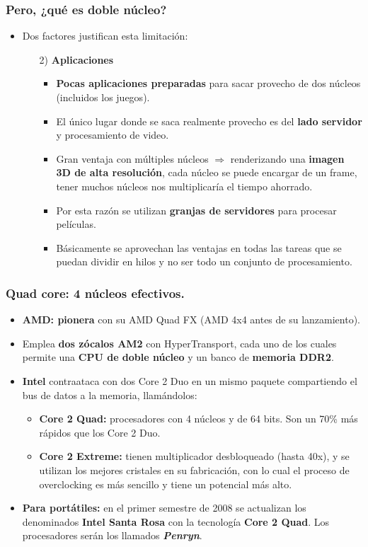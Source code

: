 \frame
{
\frametitle{Pero, ¿qué es doble núcleo?}
\begin{itemize}
 	\item Dos factores justifican esta limitación:

	\begin{itemize}
	\item[2)] \textbf{Aplicaciones}

		\begin{itemize}
		\item \textbf{Pocas aplicaciones preparadas} para sacar provecho de dos núcleos (incluidos los juegos).
		\item El único lugar donde se saca realmente provecho es del \textbf{lado servidor} y procesamiento de video.
		\item Gran ventaja con múltiples núcleos $\Rightarrow$ renderizando una \textbf{imagen 3D de alta resolución}, cada núcleo se puede encargar de un frame, tener muchos núcleos nos multiplicaría el tiempo ahorrado.
		\item Por esta razón se utilizan \textbf{granjas de servidores} para procesar películas.
		\item Básicamente se aprovechan las ventajas en todas las tareas que se puedan dividir en hilos y no ser todo un conjunto de procesamiento.
		\end{itemize}

	\end{itemize}

\end{itemize}
}

\frame
{
\frametitle{Quad core: 4 núcleos efectivos.}
\begin{itemize}
\item \textbf{AMD: pionera} con su AMD Quad FX (AMD 4x4 antes de su lanzamiento).
\item Emplea \textbf{dos zócalos AM2} con HyperTransport, cada uno de los cuales permite una \textbf{CPU de doble núcleo} y un banco de \textbf{memoria DDR2}.
\item \textbf{Intel} contraataca con dos Core 2 Duo en un mismo paquete compartiendo el bus de datos a la memoria, llamándolos:
	\begin{itemize}
	\item \textbf{Core 2 Quad:} procesadores con 4 núcleos y de 64 bits. Son un 70\% más rápidos que los Core 2 Duo.
	\item \textbf{Core 2 Extreme:} tienen multiplicador desbloqueado (hasta 40x), y se utilizan los mejores cristales en su fabricación, con lo cual el proceso de overclocking es más sencillo y tiene un potencial más alto.
	\end{itemize}
\item \textbf{Para portátiles:} en el primer semestre de 2008 se actualizan los denominados \textbf{Intel Santa Rosa} con la tecnología \textbf{Core 2 Quad}. Los procesadores serán los llamados \textbf{\textit{Penryn}}.
\end{itemize}
}


